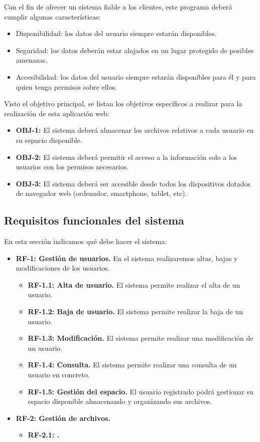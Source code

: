 Con el fin de ofrecer un sistema fiable a los clientes, este programa deberá cumplir algunas características:
\begin{itemize}
	\item Disponibilidad: los datos del usuario siempre estarán disponibles.
	\item Seguridad: los datos deberán estar alojados en un lugar protegido de posibles amenazas.
	\item Accesibilidad: los datos del usuario siempre estarán disponibles para él y para quien tenga permisos sobre ellos.
\end{itemize}

Visto el objetivo principal, se listan los objetivos específicos a realizar para la realización de esta aplicación web:
\begin{itemize}
	\item \textbf{OBJ-1:} El sistema deberá almacenar los archivos relativos a cada usuario en su espacio disponible.
	\item \textbf{OBJ-2:} El sistema deberá permitir el acceso a la información solo a los usuarios con los permisos necesarios.
	\item \textbf{OBJ-3:} El sistema deberá ser accesible desde todos los dispositivos dotados de navegador web (ordenador, smartphone, tablet, etc).
\end{itemize}

\subsection{Requisitos funcionales del sistema}
En esta sección indicamos qué debe hacer el sistema:

\begin{itemize}
	\item \textbf{RF-1: Gestión de usuarios.} En el sistema realizaremos altas, bajas y modificaciones de los usuarios.
	\begin{itemize}
		\item \textbf{RF-1.1: Alta de usuario.} El sistema permite realizar el alta de un usuario.
		\item \textbf{RF-1.2: Baja de usuario.} El sistema permite realizar la baja de un usuario.
		\item \textbf{RF-1.3: Modificación.} El sistema permite realizar una modificación de un usuario.
		\item \textbf{RF-1.4: Consulta.} El sistema permite realizar una consulta de un usuario en concreto.
		\item \textbf{RF-1.5: Gestión del espacio.}	El usuario registrado podrá gestionar su espacio disponible almacenando y organizando sus archivos.
	\end{itemize}
	
	\item \textbf{RF-2: Gestión de archivos.}
	\begin{itemize}
		\item \textbf{RF-2.1: .}
	\end{itemize}
\end{itemize}


\newpage

